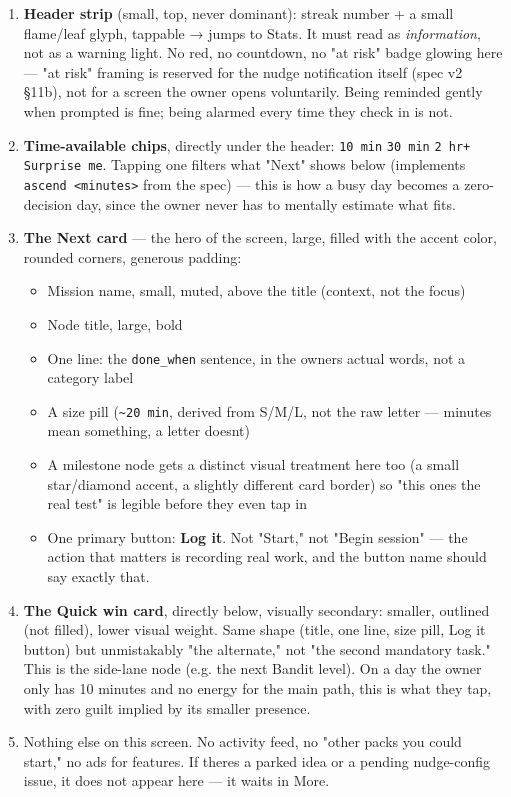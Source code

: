 \begin{enumerate}
\def\labelenumi{\arabic{enumi}.}
\tightlist
\item
  \textbf{Header strip} (small, top, never dominant): streak number + a
  small flame/leaf glyph, tappable → jumps to Stats. It must read as
  \emph{information}, not as a warning light. No red, no countdown, no
  "at risk" badge glowing here --- "at risk" framing is reserved for the
  nudge notification itself (spec v2 §11b), not for a screen the owner
  opens voluntarily. Being reminded gently when prompted is fine; being
  alarmed every time they check in is not.
\item
  \textbf{Time-available chips}, directly under the header:
  \texttt{10 min} \texttt{30 min} \texttt{2 hr+}
  \texttt{Surprise me}. Tapping one filters what "Next" shows below
  (implements \texttt{ascend \textless{}minutes\textgreater{}} from the
  spec) --- this is how a busy day becomes a zero-decision day, since
  the owner never has to mentally estimate what fits.
\item
  \textbf{The Next card} --- the hero of the screen, large, filled with
  the accent color, rounded corners, generous padding:

  \begin{itemize}
  \tightlist
  \item
    Mission name, small, muted, above the title (context, not the focus)
  \item
    Node title, large, bold
  \item
    One line: the \texttt{done\_when} sentence, in the
    owner\textquotesingle s actual words, not a category label
  \item
    A size pill (\texttt{\textasciitilde{}20 min}, derived from S/M/L,
    not the raw letter --- minutes mean something, a letter
    doesn\textquotesingle t)
  \item
    A milestone node gets a distinct visual treatment here too (a small
    star/diamond accent, a slightly different card border) so "this
    one\textquotesingle s the real test" is legible before they even tap
    in
  \item
    One primary button: \textbf{Log it}. Not "Start," not "Begin
    session" --- the action that matters is recording real work, and the
    button name should say exactly that.
  \end{itemize}
\item
  \textbf{The Quick win card}, directly below, visually secondary:
  smaller, outlined (not filled), lower visual weight. Same shape
  (title, one line, size pill, Log it button) but unmistakably "the
  alternate," not "the second mandatory task." This is the side-lane
  node (e.g. the next Bandit level). On a day the owner only has 10
  minutes and no energy for the main path, this is what they tap, with
  zero guilt implied by its smaller presence.
\item
  Nothing else on this screen. No activity feed, no "other packs you
  could start," no ads for features. If there\textquotesingle s a parked
  idea or a pending nudge-config issue, it does not appear here --- it
  waits in More.
\end{enumerate}

